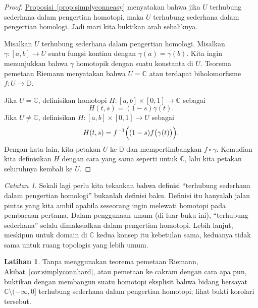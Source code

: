 \documentclass[12pt,openany]{book}
\newcommand{\C}{{\mathbb{C}}}
\newcommand{\D}{{\mathbb{D}}}
\newcommand{\myquote}[1]{``#1''}
\theoremstyle{plain}
\theoremstyle{remark}
\newtheorem{remark}[thm]{Catatan}
\theoremstyle{definition}
\newenvironment{exbox}{%
    \def\FrameCommand{\vrule width 1pt \relax\hspace{10pt}}%
    \MakeFramed{\advance\hsize-\width\FrameRestore}%
}{%
    \endMakeFramed
}
\theoremstyle{exercise}
\newtheorem{exercise}{Latihan}[section]
\theoremstyle{example}
\newcommand{\propref}[1]{\hyperref[#1]{Proposisi~\ref*{#1}}}
\newcommand{\corref}[1]{\hyperref[#1]{Akibat~\ref*{#1}}}
\begin{document}
\begin{proof}
\propref{prop:simplyconneasy} menyatakan bahwa jika $U$
terhubung sederhana dalam pengertian homotopi, maka $U$ terhubung sederhana
dalam pengertian homologi. Jadi mari kita buktikan arah sebaliknya.

Misalkan $U$ terhubung sederhana dalam
pengertian homologi.
Misalkan $\gamma \colon [a,b] \to U$ suatu fungsi kontinu dengan
$\gamma(a)=\gamma(b)$. Kita ingin menunjukkan bahwa $\gamma$ homotopik dengan suatu
konstanta di $U$.
Teorema pemetaan Riemann menyatakan bahwa $U =
\C$ atau terdapat biholomorfisme $f \colon U \to \D$.

Jika $U = \C$, definisikan homotopi $H \colon [a,b] \times [0,1] \to
\C$ sebagai
\begin{equation*}
H(t,s) = (1-s) \gamma(t) .
\end{equation*}
Jika $U \neq \C$, definisikan $H \colon [a,b] \times [0,1] \to U$ sebagai
\begin{equation*}
H(t,s) = f^{-1} \Bigl( (1-s) f \bigl( \gamma(t) \bigr) \Bigr) .
\end{equation*}
Dengan kata lain, kita petakan $U$ ke $\D$ dan mempertimbangkan $f \circ \gamma$.
Kemudian kita definisikan $H$ dengan cara yang sama seperti untuk $\C$, lalu kita
petakan seluruhnya kembali ke $U$.
\end{proof}

\begin{remark}
Sekali lagi perlu kita tekankan bahwa definisi
\myquote{terhubung sederhana dalam pengertian homologi} bukanlah definisi baku.
Definisi itu hanyalah jalan pintas yang kita ambil apabila seseorang ingin
melewati homotopi pada pembacaan pertama. Dalam penggunaan umum (di luar buku ini),
\myquote{terhubung sederhana} selalu
dimaksudkan dalam pengertian homotopi. Lebih lanjut, meskipun untuk domain di $\C$ kedua
konsep itu kebetulan sama, keduanya tidak sama untuk
ruang topologis yang lebih umum.
\end{remark}

\begin{exbox}
\begin{exercise}
Tanpa menggunakan teorema pemetaan Riemann, \corref{cor:simplyconnhard},
atau pemetaan ke cakram dengan cara apa pun, buktikan dengan membangun suatu homotopi eksplisit
bahwa bidang bersayat $\C \setminus (-\infty,0]$ terhubung sederhana dalam
pengertian homotopi; lihat bukti korolari tersebut.
\end{exercise}
\end{exbox}
\end{document}
